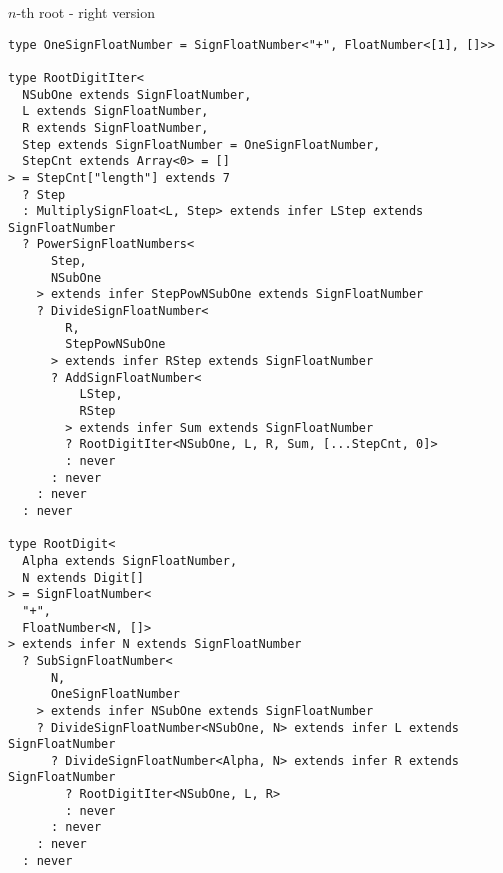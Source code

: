 \begin{listing}[ht]
  \caption{$n$-th root - right version}\label{lst:root-right}
  \begin{verbatim}
type OneSignFloatNumber = SignFloatNumber<"+", FloatNumber<[1], []>>

type RootDigitIter<
  NSubOne extends SignFloatNumber,
  L extends SignFloatNumber,
  R extends SignFloatNumber,
  Step extends SignFloatNumber = OneSignFloatNumber,
  StepCnt extends Array<0> = []
> = StepCnt["length"] extends 7
  ? Step
  : MultiplySignFloat<L, Step> extends infer LStep extends SignFloatNumber
  ? PowerSignFloatNumbers<
      Step,
      NSubOne
    > extends infer StepPowNSubOne extends SignFloatNumber
    ? DivideSignFloatNumber<
        R,
        StepPowNSubOne
      > extends infer RStep extends SignFloatNumber
      ? AddSignFloatNumber<
          LStep,
          RStep
        > extends infer Sum extends SignFloatNumber
        ? RootDigitIter<NSubOne, L, R, Sum, [...StepCnt, 0]>
        : never
      : never
    : never
  : never

type RootDigit<
  Alpha extends SignFloatNumber,
  N extends Digit[]
> = SignFloatNumber<
  "+",
  FloatNumber<N, []>
> extends infer N extends SignFloatNumber
  ? SubSignFloatNumber<
      N,
      OneSignFloatNumber
    > extends infer NSubOne extends SignFloatNumber
    ? DivideSignFloatNumber<NSubOne, N> extends infer L extends SignFloatNumber
      ? DivideSignFloatNumber<Alpha, N> extends infer R extends SignFloatNumber
        ? RootDigitIter<NSubOne, L, R>
        : never
      : never
    : never
  : never
\end{verbatim}
\end{listing}

\clearpage